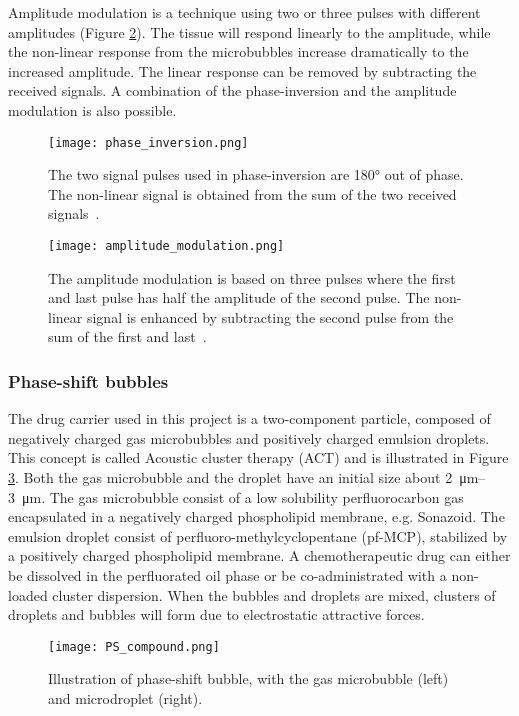 Amplitude modulation is a technique using two or three pulses with different amplitudes (Figure \ref{Fig:amplitude modulation}). The tissue will respond linearly to the amplitude, while the non-linear response from the microbubbles increase dramatically to the increased amplitude. The linear response can be removed by subtracting the received signals. A combination of the phase-inversion and the amplitude modulation is also possible. 

\begin{figure}[h]
  \centering
  \texttt{[image: phase\_inversion.png]}
  \caption{The two signal pulses used in phase-inversion are \ang{180} out of phase. The non-linear signal is obtained from the sum of the two received signals~\cite{Hoskins2010}.}
  \label{Fig:phase inversion}
\end{figure}
\begin{figure}[h]
	\centering
	\texttt{[image: amplitude\_modulation.png]}
	\caption{The amplitude modulation is based on three pulses where the first and last pulse has half the amplitude of the second pulse. The non-linear signal is enhanced by subtracting the second pulse from the sum of the first and last~\cite{Hoskins2010}.}
	\label{Fig:amplitude modulation}
\end{figure}
\clearpage
\subsubsection{Phase-shift bubbles}
The drug carrier used in this project is a two-component particle, composed of negatively charged gas microbubbles and positively charged emulsion droplets. This concept is called Acoustic cluster therapy (ACT\texttrademark{}) and is illustrated in Figure \ref{Fig:ACT}. Both the gas microbubble and the droplet have an initial size about \SIrange{2}{3}{\micro\metre}. The gas microbubble consist of a low solubility perfluorocarbon gas encapsulated in a negatively charged phospholipid membrane, e.g. Sonazoid\texttrademark{}. The emulsion droplet consist of perfluoro-methylcyclopentane (pf-MCP), stabilized by a positively charged phospholipid membrane. A chemotherapeutic drug can either be dissolved in the perfluorated oil phase or be co-administrated with a non-loaded cluster dispersion. When the bubbles and droplets are mixed, clusters of droplets and bubbles will form due to electrostatic attractive forces.


\begin{figure}[h]
  \centering
  \texttt{[image: PS\_compound.png]}
  \caption{Illustration of phase-shift bubble, with the gas microbubble (left) and microdroplet (right).}
  \label{Fig:ACT}
\end{figure}


